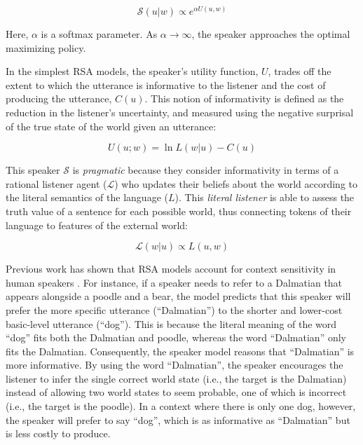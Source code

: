 \documentclass[manuscript]{stjour}
\begin{document}
\begin{equation}
\mathcal{S}(u|w) \propto e^{\alpha U(u,w)}
\end{equation}

Here, $\alpha$ is a softmax parameter. As $\alpha \rightarrow \infty$, the speaker approaches the optimal maximizing policy. 

In the simplest RSA models, the speaker's utility function, $U$, trades off the extent to which the utterance is informative to the listener and the cost of producing the utterance, $C(u)$. This notion of informativity is defined as the reduction in the listener's uncertainty, and measured using the negative surprisal of the true state of the world given an utterance:

\begin{equation}
U(u;w) = \ln L(w|u) - C(u)
\end{equation}

This speaker $\mathcal{S}$ is \emph{pragmatic} because they consider informativity in terms of a rational listener agent ($\mathcal{L}$) who updates their beliefs about the world according to the literal semantics of the language ($L$). This \emph{literal listener} is able to assess the truth value of a sentence for each possible world, thus connecting tokens of their language to features of the external world:

\begin{equation}
\mathcal{L}(w|u) \propto L(u,w)
\end{equation}

Previous work has shown that RSA models account for context sensitivity in human speakers \cite[]{GrafEtAl16_BasicLevel}. For instance, if a speaker needs to refer to a Dalmatian that appears alongside a poodle and a bear, the model predicts that this speaker will prefer the more specific utterance (``Dalmatian'') to the shorter and lower-cost basic-level utterance (``dog''). This is because the literal meaning of the word ``dog'' fits both the Dalmatian and poodle, whereas the word ``Dalmatian'' only fits the Dalmatian. Consequently, the speaker model reasons that ``Dalmatian'' is more informative. By using the word ``Dalmatian'', the speaker encourages the listener to infer the single correct world state (i.e., the target is the Dalmatian) instead of allowing two world states to seem probable, one of which is incorrect (i.e., the target is the poodle). In a context where there is only one dog, however, the speaker will prefer to say ``dog'', which is as informative as ``Dalmatian'' but is less costly to produce. 
\end{document}
